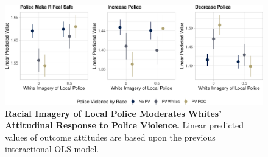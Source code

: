 \documentclass[
  11pt,
]{article}
\begin{document}
\begin{figure}[t]

{\centering \includegraphics{paper_files/figure-pdf/fig-racial-component-1.pdf}

}

\caption{\label{fig-racial-component}\textbf{Racial Imagery of Local
Police Moderates Whites' Attitudinal Response to Police Violence.}
Linear predicted values of outcome attitudes are based upon the previous
interactional OLS model.}

\end{figure}
\end{document}
